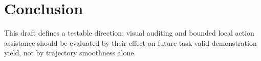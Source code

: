 \section{Conclusion}
\label{sec:conclusion}

This draft defines a testable direction: visual auditing and bounded local
action assistance should be evaluated by their effect on future task-valid
demonstration yield, not by trajectory smoothness alone.
